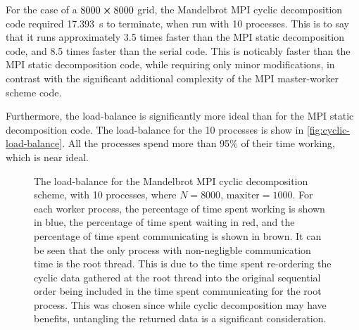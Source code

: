 \documentclass{article}
\begin{document}
For the case of a $8000 \cross 8000$ grid, the Mandelbrot MPI cyclic
decomposition code required \SI{17.393}{\second} to terminate, when run with 10
processes.
This is to say that it runs approximately 3.5 times faster than the MPI static
decomposition code, and 8.5 times faster than the serial code.
This is noticably faster than the MPI static decomposition code, while requiring
only minor modifications, in contrast with the significant additional complexity
of the MPI master-worker scheme code.

Furthermore, the load-balance is significantly more ideal than for the MPI
static decomposition code.
The load-balance for the 10 processes is show in
\autoref{fig:cyclic-load-balance}.
All the processes spend more than 95\% of their time working, which is near
ideal.
\begin{figure}[h]
  \centering
  \caption{The load-balance for the Mandelbrot MPI cyclic decomposition scheme,
    with 10 processes, where $N = 8000$, $\mathrm{maxiter} = 1000$. For each
    worker process, the percentage of time spent working is shown in blue, the
    percentage of time spent waiting in red, and the percentage of time spent
    communicating is shown in brown. It can be seen that the only process with
    non-negligble communication time is the root thread. This is due to the time
    spent re-ordering the cyclic data gathered at the root thread into the
    original sequential order being included in the time spent communicating for
    the root process. This was chosen since while cyclic decomposition may have
    benefits, untangling the returned data is a significant consideration.}
  \label{fig:cyclic-load-balance}
\end{figure}
\end{document}
